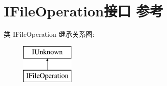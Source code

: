 \hypertarget{interface_i_file_operation}{}\section{I\+File\+Operation接口 参考}
\label{interface_i_file_operation}
类 I\+File\+Operation 继承关系图\+:\begin{figure}[H]
\begin{center}
\leavevmode
\includegraphics[height=2.000000cm]{interface_i_file_operation}
\end{center}
\end{figure}
